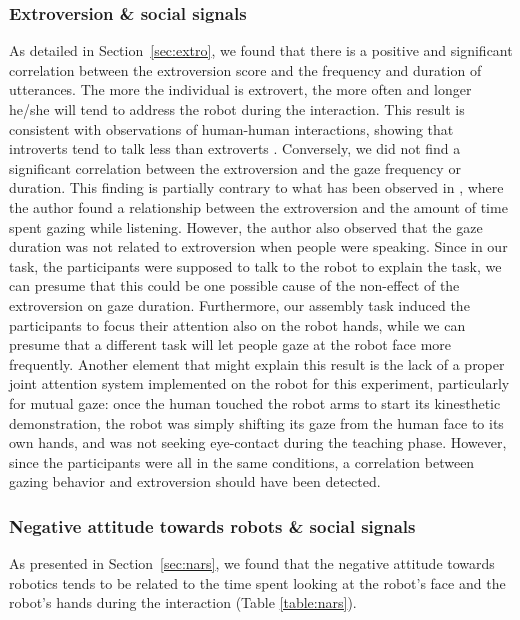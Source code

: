\subsubsection{Extroversion \& social signals}
As detailed in Section~\ref{sec:extro}, we found that there is a positive and significant correlation between the extroversion score and the frequency and duration of utterances.
The more the individual is extrovert, the more often and longer he/she will tend to address the robot during the interaction. 
This result is consistent with observations of human-human interactions, showing that introverts tend to talk less than extroverts \cite{Scherer1981}. 
Conversely, we did not find a significant correlation between the extroversion and the gaze frequency or duration. This finding is partially contrary to what has been observed in \cite{Iizuka1992}, where the author found a relationship between the extroversion and the amount of time spent gazing while listening. However, the author also observed that the gaze duration was not related to extroversion when people were speaking. Since in our task, the participants were supposed to talk to the robot to explain the task, we can presume that this could be one possible cause of the non-effect of the extroversion on gaze duration. Furthermore, our assembly task induced the participants to focus their attention also on the robot hands, while we can presume that a different task will let people gaze at the robot face more frequently.
Another element that might explain this result is the lack of a proper joint attention system implemented on the robot for this experiment, particularly for mutual gaze: once the human touched the robot arms to start its kinesthetic demonstration, the robot was simply shifting its gaze from the human face to its own hands, and was not seeking eye-contact during the teaching phase.
However, since the participants were all in the same conditions, a correlation between gazing behavior and extroversion should have been detected.

\subsubsection{Negative attitude towards robots \& social signals} 
As presented in Section~\ref{sec:nars}, we found that the negative attitude towards robotics tends to be related to the time spent looking at the robot's face and the robot's hands during the interaction (Table \ref{table:nars}).

